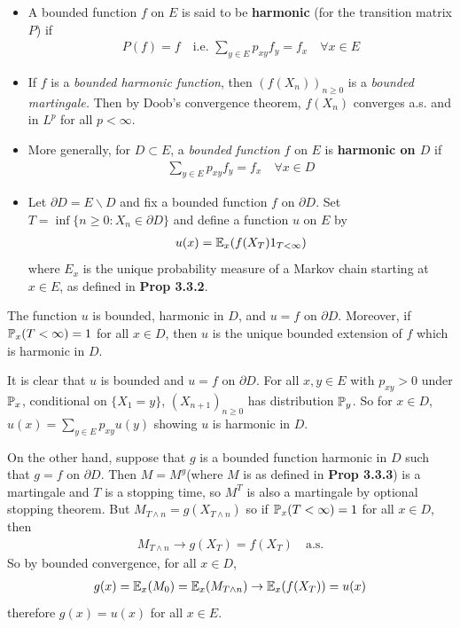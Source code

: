 \documentclass[10pt,a4paper]{report}
\newenvironment{proof}
{\begin{changemargin}{1cm}{0.5cm} 
	}%
	{\end{changemargin}
}
\begin{document}
\begin{itemize}
\item A bounded function $f$ on $E$ is said to be \textbf{harmonic} (for the transition matrix $P$) if 
\begin{align*}
P(f) = f \quad \text{i.e. } \sum_{y\in E} p_{xy}f_y = f_x \quad \forall x\in E
\end{align*}
\item If $f$ is a \emph{bounded harmonic function}, then $(f(X_n))_{n\geq 0}$ is a \emph{bounded martingale.} Then by Doob's convergence theorem, $f(X_n)$ converges a.s. and in $L^p$ for all $p<\infty$.
\item More generally, for $D\subset E$, a \emph{bounded function} $f$ on $E$ is \textbf{harmonic on $D$} if
\begin{align*}
\sum_{y\in E} p_{xy}f_y = f_x \quad \forall x\in D
\end{align*}
\item Let $\partial D = E\backslash D$ and fix a bounded function $f$ on $\partial D$. Set $T= \inf \{n\geq 0: X_n \in \partial D \}$ and define a function $u$ on $E$ by
\begin{align*}
u(x) = \mathbb{E}_x (f(X_T) 1_{T<\infty} )
\end{align*}
where $E_x$ is the unique probability measure of a Markov chain starting at $x \in E$, as defined in \textbf{Prop 3.3.2}.
\end{itemize}
\s

 The function $u$ is bounded, harmonic in $D$, and $u=f$ on $\partial D$. Moreover, if $\mathbb{P}_x (T<\infty) =1 $ for all $x\in D$, then $u$ is the unique bounded extension of $f$ which is harmonic in $D$.
\begin{proof}
\pf It is clear that $u$ is bounded and $u = f$ on $\partial D$. For all $x,y\in E$ with $p_{xy}>0$ under $\mathbb{P}_x$, conditional on $\{X_1 = y \}$, $(X_{n+1})_{n\geq 0}$ has distribution $\mathbb{P}_y$. So for $x\in D$, $u(x)= \sum_{y\in E} p_{xy} u(y)$ showing $u$ is harmonic in $D$.

\quad On the other hand, suppose that $g$ is a bounded function harmonic in $D$ such that $g= f$ on $\partial D$. Then $M = M^g$(where $M$ is as defined in \textbf{Prop 3.3.3}) is a martingale and $T$ is a stopping time, so $M^T$ is also a martingale by optional stopping theorem. But $M_{T \wedge n} = g(X_{T\wedge n})$ so if $\mathbb{P}_x (T <\infty)=1$ for all $x\in D$, then
\begin{align*}
M_{T \wedge n} \rightarrow g(X_T) = f(X_T) \quad \text{a.s.}
\end{align*}
So by bounded convergence, for all $x\in D$,
\begin{align*}
g(x) = \mathbb{E}_x (M_0) = \mathbb{E}_x (M_{T\wedge n}) \rightarrow \mathbb{E}_x(f(X_T)) = u(x)
\end{align*}
therefore $g(x) = u(x)$ for all $x\in E$.

\eop
\end{proof}
\s
\end{document}
